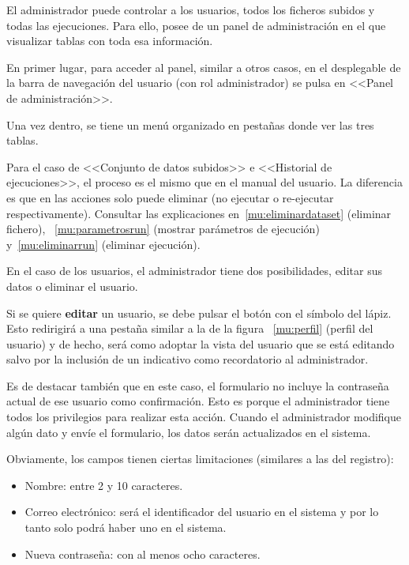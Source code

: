 El administrador puede controlar a los usuarios, todos los ficheros subidos y
todas las ejecuciones. Para ello, posee de un panel de administración en el que
visualizar tablas con toda esa información.

En primer lugar, para acceder al panel, similar a otros casos, en el desplegable
de la barra de navegación del usuario (con rol administrador) se pulsa en
<<Panel de administración>>.


Una vez dentro, se tiene un menú organizado en pestañas donde ver las tres tablas.




Para el caso de <<Conjunto de datos subidos>> e <<Historial de ejecuciones>>, el
proceso es el mismo que en el manual del usuario. La diferencia es que en las
acciones solo puede eliminar (no ejecutar o re-ejecutar respectivamente).
Consultar las explicaciones  en~\ref{mu:eliminardataset} (eliminar fichero),
~\ref{mu:parametrosrun} (mostrar parámetros de ejecución) y~\ref{mu:eliminarrun}
(eliminar ejecución).

En el caso de los usuarios, el administrador tiene dos posibilidades, editar sus
datos o eliminar el usuario.

Si se quiere \textbf{editar} un usuario, se debe pulsar el botón con el símbolo
del lápiz. Esto redirigirá a una pestaña similar a la de la figura
~\ref{mu:perfil} (perfil del usuario) y de hecho, será como adoptar la vista del
usuario que se está editando salvo por la inclusión de un indicativo como
recordatorio al administrador.


Es de destacar también que en este caso, el formulario no incluye la contraseña
actual de ese usuario como confirmación. Esto es porque el administrador tiene
todos los privilegios para realizar esta acción. Cuando el administrador
modifique algún dato y envíe el formulario, los datos serán actualizados en el
sistema. 

Obviamente, los campos tienen ciertas limitaciones (similares a las del
registro):
\begin{itemize}
    \item Nombre: entre 2 y 10 caracteres.
    \item Correo electrónico: será el identificador del usuario en el sistema y
    por lo tanto solo podrá haber uno en el sistema.
    \item Nueva contraseña: con al menos ocho caracteres.
\end{itemize}

